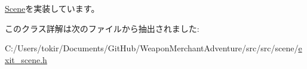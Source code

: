 \mbox{\hyperlink{class_scene_ab71ee5f19764b90c87b4574aa1cb1d25}{Scene}}を実装しています。



このクラス詳解は次のファイルから抽出されました\+:\begin{DoxyCompactItemize}
\item 
C\+:/\+Users/tokir/\+Documents/\+Git\+Hub/\+Weapon\+Merchant\+Adventure/src/src/scene/\mbox{\hyperlink{exit__scene_8h}{exit\+\_\+scene.\+h}}\end{DoxyCompactItemize}
